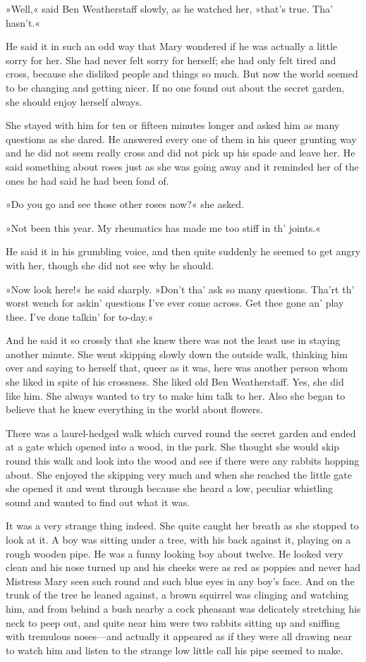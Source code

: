 »Well,« said Ben Weatherstaff slowly, as he watched her, »that's true. Tha' hasn't.«

He said it in such an odd way that Mary wondered if he was actually a little sorry for her. She had never felt sorry for herself; she had only felt tired and cross, because she disliked people and things so much. But now the world seemed to be changing and getting nicer. If no one found out about the secret garden, she should enjoy herself always.

She stayed with him for ten or fifteen minutes longer and asked him as many questions as she dared. He answered every one of them in his queer grunting way and he did not seem really cross and did not pick up his spade and leave her. He said something about roses just as she was going away and it reminded her of the ones he had said he had been fond of.

»Do you go and see those other roses now?« she asked.

»Not been this year. My rheumatics has made me too stiff in th' joints.«

He said it in his grumbling voice, and then quite suddenly he seemed to get angry with her, though she did not see why he should.

»Now look here!« he said sharply. »Don't tha' ask so many questions. Tha'rt th' worst wench for askin' questions I've ever come across. Get thee gone an' play thee. I've done talkin' for to-day.«

And he said it so crossly that she knew there was not the least use in staying another minute. She went skipping slowly down the outside walk, thinking him over and saying to herself that, queer as it was, here was another person whom she liked in spite of his crossness. She liked old Ben Weatherstaff. Yes, she did like him. She always wanted to try to make him talk to her. Also she began to believe that he knew everything in the world about flowers.

There was a laurel-hedged walk which curved round the secret garden and ended at a gate which opened into a wood, in the park. She thought she would skip round this walk and look into the wood and see if there were any rabbits hopping about. She enjoyed the skipping very much and when she reached the little gate she opened it and went through because she heard a low, peculiar whistling sound and wanted to find out what it was.

It was a very strange thing indeed. She quite caught her breath as she stopped to look at it. A boy was sitting under a tree, with his back against it, playing on a rough wooden pipe. He was a funny looking boy about twelve. He looked very clean and his nose turned up and his cheeks were as red as poppies and never had Mistress Mary seen such round and such blue eyes in any boy's face. And on the trunk of the tree he leaned against, a brown squirrel was clinging and watching him, and from behind a bush nearby a cock pheasant was delicately stretching his neck to peep out, and quite near him were two rabbits sitting up and sniffing with tremulous noses—and actually it appeared as if they were all drawing near to watch him and listen to the strange low little call his pipe seemed to make.


